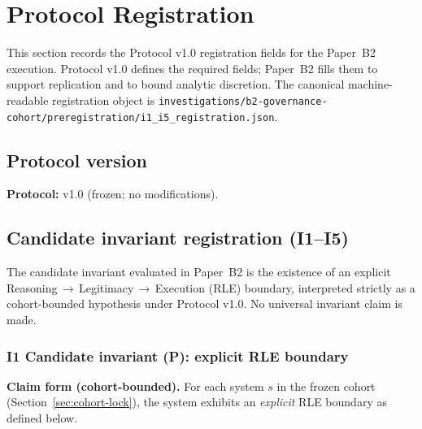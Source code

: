 \section{Protocol Registration}
\label{sec:protocol-registration}
This section records the Protocol v1.0 registration fields for the Paper~B2 execution. Protocol v1.0 defines the required fields; Paper~B2 fills them to support replication and to bound analytic discretion. The canonical machine-readable registration object is \texttt{investigations/b2-governance-cohort/preregistration/i1\_i5\_registration.json}.

\subsection{Protocol version}
\textbf{Protocol:} v1.0 (frozen; no modifications).

\subsection{Candidate invariant registration (I1--I5)}
The candidate invariant evaluated in Paper~B2 is the existence of an explicit Reasoning\,$\rightarrow$\,Legitimacy\,$\rightarrow$\,Execution (RLE) boundary, interpreted strictly as a cohort-bounded hypothesis under Protocol v1.0. No universal invariant claim is made.

\subsubsection{I1 Candidate invariant (P): explicit RLE boundary}
\textbf{Claim form (cohort-bounded).} For each system $s$ in the frozen cohort (Section~\ref{sec:cohort-lock}), the system exhibits an \emph{explicit} RLE boundary as defined below.

